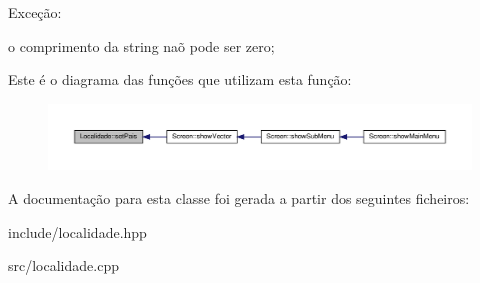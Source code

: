 Exceção\+:
\begin{DoxyItemize}
\item o comprimento da string naõ pode ser zero;
\end{DoxyItemize}Este é o diagrama das funções que utilizam esta função\+:\nopagebreak
\begin{figure}[H]
\begin{center}
\leavevmode
\includegraphics[width=350pt]{classLocalidade_af8e89f3bdcf8dd7bb1f3f74fdc8bc119_icgraph}
\end{center}
\end{figure}


A documentação para esta classe foi gerada a partir dos seguintes ficheiros\+:\begin{DoxyCompactItemize}
\item 
include/localidade.\+hpp\item 
src/localidade.\+cpp\end{DoxyCompactItemize}
